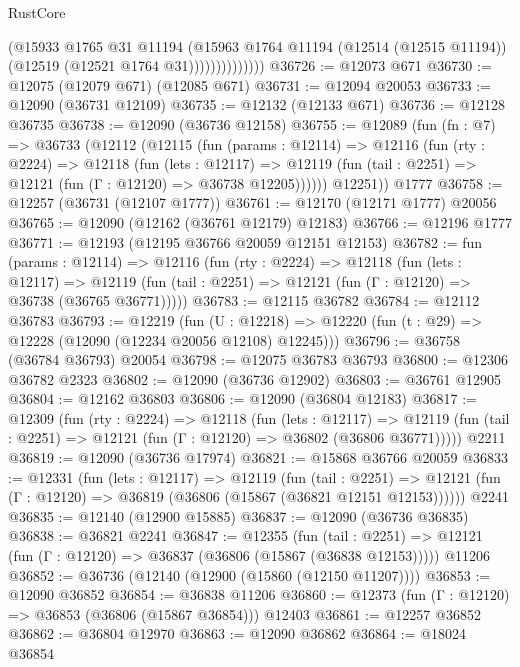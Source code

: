 \begin{lexlean}{RustCore}
\begin{coremodule}
                        (@15933
                          @1765
                          @31
                          @11194
                          (@15963
                            @1764
                            @11194
                            (@12514 (@12515 @11194))
                            (@12519 (@12521 @1764 @31))))))))))))))
@36726 := @12073 @671
@36730 := @12075 (@12079 @671) (@12085 @671)
@36731 := @12094 @20053
@36733 := @12090 (@36731 @12109)
@36735 := @12132 (@12133 @671)
@36736 := @12128 @36735
@36738 := @12090 (@36736 @12158)
@36755 := @12089
    (fun (fn : @7) =>
    @36733
      (@12112
        (@12115
          (fun (params : @12114) =>
          @12116
            (fun (rty : @2224) =>
            @12118
              (fun (lets : @12117) =>
              @12119 (fun (tail : @2251) => @12121 (fun (Γ : @12120) => @36738 @12205))))))
        @12251))
    @1777
@36758 := @12257 (@36731 (@12107 @1777))
@36761 := @12170 (@12171 @1777) @20056
@36765 := @12090 (@12162 (@36761 @12179) @12183)
@36766 := @12196 @1777
@36771 := @12193 (@12195 @36766 @20059 @12151 @12153)
@36782 := fun (params : @12114) =>
  @12116
    (fun (rty : @2224) =>
    @12118
      (fun (lets : @12117) =>
      @12119 (fun (tail : @2251) => @12121 (fun (Γ : @12120) => @36738 (@36765 @36771)))))
@36783 := @12115 @36782
@36784 := @12112 @36783
@36793 := @12219
    (fun (U : @12218) => @12220 (fun (t : @29) => @12228 (@12090 (@12234 @20056 @12108) @12245)))
@36796 := @36758 (@36784 @36793) @20054
@36798 := @12075 @36783 @36793
@36800 := @12306 @36782 @2323
@36802 := @12090 (@36736 @12902)
@36803 := @36761 @12905
@36804 := @12162 @36803
@36806 := @12090 (@36804 @12183)
@36817 := @12309
    (fun (rty : @2224) =>
    @12118
      (fun (lets : @12117) =>
      @12119 (fun (tail : @2251) => @12121 (fun (Γ : @12120) => @36802 (@36806 @36771)))))
    @2211
@36819 := @12090 (@36736 @17974)
@36821 := @15868 @36766 @20059
@36833 := @12331
    (fun (lets : @12117) =>
    @12119
      (fun (tail : @2251) =>
      @12121 (fun (Γ : @12120) => @36819 (@36806 (@15867 (@36821 @12151 @12153))))))
    @2241
@36835 := @12140 (@12900 @15885)
@36837 := @12090 (@36736 @36835)
@36838 := @36821 @2241
@36847 := @12355
    (fun (tail : @2251) => @12121 (fun (Γ : @12120) => @36837 (@36806 (@15867 (@36838 @12153)))))
    @11206
@36852 := @36736 (@12140 (@12900 (@15860 (@12150 @11207))))
@36853 := @12090 @36852
@36854 := @36838 @11206
@36860 := @12373 (fun (Γ : @12120) => @36853 (@36806 (@15867 @36854))) @12403
@36861 := @12257 @36852
@36862 := @36804 @12970
@36863 := @12090 @36862
@36864 := @18024 @36854

\end{coremodule}
\end{lexlean}
